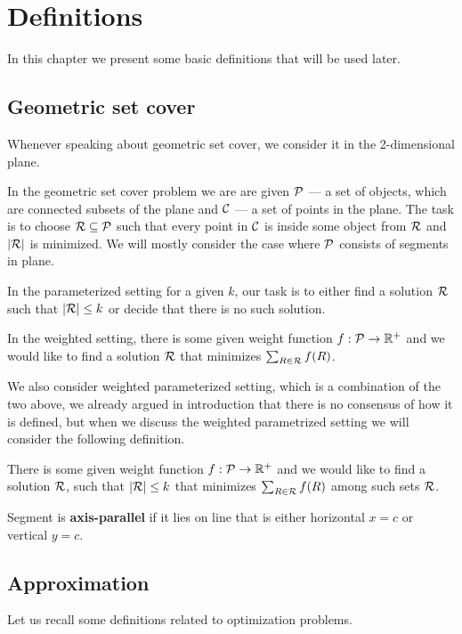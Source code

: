 \chapter{Definitions}

In this chapter we present some basic definitions that
will be used later.

\section{Geometric set cover}
Whenever speaking about geometric set cover,
we consider it in the 2-dimensional plane.

In the geometric set cover problem we are are given
$\mathcal{P}$ --- a set of objects, which are connected
subsets of the plane and $\mathcal{C}$ --- a set of points in the plane.
The task is to choose $\mathcal{R} \subseteq \mathcal{P}$ such that
every point in $\mathcal{C}$ is inside some object from $\mathcal{R}$
and $|\mathcal{R}|$ is minimized. We will mostly consider the case where
$\mathcal{P}$ consists of segments in plane. 

In the parameterized setting for a given $k$,
our task is to either find a solution $\mathcal{R}$ such that $|\mathcal{R}| \le k$
or decide that there is no such solution.

In the weighted setting, there is some given weight function
$f : \mathcal{P} \rightarrow \mathbb{R^+}$
and we would like to find a solution $\mathcal{R}$
that minimizes $\sum_{R \in \mathcal{R}} f(R)$.

We also consider weighted parameterized setting, which is a combination
of the two above, we already argued in introduction that there is
no consensus of how it is defined, but when we discuss the
weighted parametrized setting we will consider the following
definition.

There is some given weight function
$f : \mathcal{P} \rightarrow \mathbb{R^+}$
and we would like to find a solution $\mathcal{R}$,
such that $|\mathcal{R}| \le k$
that minimizes $\sum_{R \in \mathcal{R}} f(R)$ among such sets $\mathcal{R}$.

\begin{defi}
Segment is \textbf{axis-parallel} if it lies on line that is
either horizontal $x = c$ or vertical $y = c$.
\end{defi}

\section{Approximation}

Let us recall some definitions related to optimization problems.

